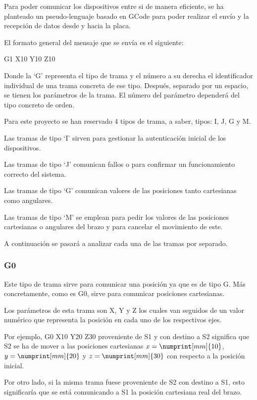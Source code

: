 Para poder comunicar los dispositivos entre si de manera eficiente, se ha planteado un pseudo-lenguaje basado en GCode para poder realizar el envío y la recepción de datos desde y hacia la placa.

El formato general del mensaje que se envía es el siguiente:

\begin{center}
    {\Large G1 X10 Y10 Z10}
\end{center}

Donde la `G' representa el tipo de trama y el número a su derecha el identificador individual de una trama concreta de ese tipo.
Después, separado por un espacio, se tienen los parámetros de la trama. El número del parámetro dependerá del tipo concreto de orden.

Para este proyecto se han reservado 4 tipos de trama, a saber, tipos: I, J, G y M.

Las tramas de tipo `I' sirven para gestionar la autenticación inicial de los dispositivos.

Las tramas de tipo `J' comunican fallos o para confirmar un funcionamiento correcto del sistema.

Las tramas de tipo `G' comunican valores de las posiciones tanto cartesianas como angulares.

Las tramas de tipo `M' se emplean para pedir los valores de las posiciones cartesianas o angulares del brazo y para cancelar el movimiento de este.

A continuación se pasará a analizar cada una de las tramas por separado.

\subsubsection{G0}
Este tipo de trama sirve para comunicar una posición ya que es de tipo G. Más concretamente, como es G0, sirve para comunicar posiciones cartesianas.

Los parámetros de esta trama son X, Y y Z los cuales van seguidos de un valor numérico que representa la posición en cada uno de los respectivos ejes.

Por ejemplo, G0 X10 Y20 Z30 proveniente de \ac{S1} y con destino a \ac{S2} significa que \ac{S2} se ha de mover a las posiciones cartesianas $x=\numprint[mm]{10}$, $y=\numprint[mm]{20}$ y $z=\numprint[mm]{30}$ con respecto a la posición inicial.

Por otro lado, si la misma trama fuese proveniente de \ac{S2} con destino a \ac{S1}, esto significaría que se está comunicando a \ac{S1} la posición cartesiana real del brazo.

